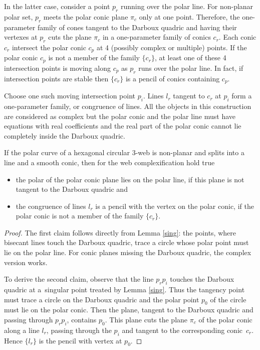 In the latter case, consider a point $p_r$ running over the polar line. For non-planar polar set, $p_r$ meets the polar conic plane $\pi_c$ only at one point. Therefore, the one-parameter family of cones tangent to the Darboux quadric and having their vertexes at $p_r$ cuts the plane $\pi_c$ in a one-parameter family of conics $c_r$. Each conic $c_r$ intersect the polar conic $c_p$ at 4 (possibly complex or multiple) points. If the polar conic $c_p$ is not a member of the family $\{c_r\}$, at least one of these 4 intersection points is moving along $c_p$ as $p_r$ runs over the polar line. In fact, if intersection points are stable then $\{c_r\}$ is a pencil of conics containing $c_p$.

Choose one such moving intersection point $p_i$. Lines $l_r$ tangent to $c_r$ at $p_i$ form a one-parameter family, or congruence of lines. All the objects in this construction are considered as complex but the polar conic and the polar line must have equations with real coefficients and the real part of the polar conic cannot lie completely inside the Darboux quadric.

\begin{Proposition}\label{geometryconic}
If the polar curve of a hexagonal circular $3$-web is non-planar and splits into a line and a smooth conic, then for the web complexification hold true
\begin{itemize}\itemsep=0pt
\item[$(1)$] the polar of the polar conic plane lies on the polar line, if this plane is not tangent to the Darboux quadric and
\item[$(2)$] the congruence of lines $l_r$ is a pencil with the vertex on the polar conic, if the polar conic is not a member of the family $\{c_r\}$.
\end{itemize}
\end{Proposition}
\begin{proof}
 The first claim follows directly from Lemma \ref{sing}: the points, where bisecant lines touch the Darboux quadric, trace a circle whose polar point must lie on the polar line. For conic planes missing the Darboux quadric, the complex version works.

To derive the second claim, observe that the line $p_rp_i$ touches the Darboux quadric at a~singular point treated by Lemma \ref{sing}. Thus the tangency point must trace a circle on the Darboux quadric and the polar point $p_0$ of the circle must lie on the polar conic. Then the plane, tangent to the Darboux quadric and passing through $p_rp_i$, contains $p_0$. This plane cuts the plane $\pi_c$ of the polar conic along a line $l_r$, passing through the $p_i$ and tangent to the corresponding conic~$c_r$. Hence $\{l_r\}$ is the pencil with vertex at $p_0$.
\end{proof}

